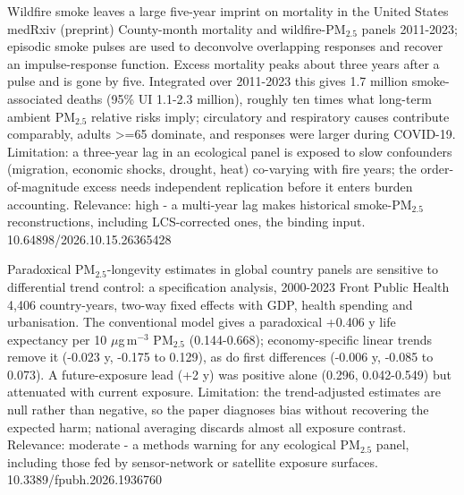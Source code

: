 \documentclass[10pt]{article}
\begin{document}
{Wildfire smoke leaves a large five-year imprint on mortality in the United States}
{medRxiv (preprint)}
{County-month mortality and wildfire-PM$_{2.5}$ panels 2011-2023; episodic smoke pulses are used to deconvolve overlapping responses and recover an impulse-response function. Excess mortality peaks about three years after a pulse and is gone by five. Integrated over 2011-2023 this gives 1.7 million smoke-associated deaths (95\% UI 1.1-2.3 million), roughly ten times what long-term ambient PM$_{2.5}$ relative risks imply; circulatory and respiratory causes contribute comparably, adults >=65 dominate, and responses were larger during COVID-19. Limitation: a three-year lag in an ecological panel is exposed to slow confounders (migration, economic shocks, drought, heat) co-varying with fire years; the order-of-magnitude excess needs independent replication before it enters burden accounting. Relevance: high - a multi-year lag makes historical smoke-PM$_{2.5}$ reconstructions, including LCS-corrected ones, the binding input.}
{10.64898/2026.10.15.26365428}

{Paradoxical PM$_{2.5}$-longevity estimates in global country panels are sensitive to differential trend control: a specification analysis, 2000-2023}
{Front Public Health}
{4,406 country-years, two-way fixed effects with GDP, health spending and urbanisation. The conventional model gives a paradoxical +0.406 y life expectancy per 10 $\mu$g\,m$^{-3}$ PM$_{2.5}$ (0.144-0.668); economy-specific linear trends remove it (-0.023 y, -0.175 to 0.129), as do first differences (-0.006 y, -0.085 to 0.073). A future-exposure lead (+2 y) was positive alone (0.296, 0.042-0.549) but attenuated with current exposure. Limitation: the trend-adjusted estimates are null rather than negative, so the paper diagnoses bias without recovering the expected harm; national averaging discards almost all exposure contrast. Relevance: moderate - a methods warning for any ecological PM$_{2.5}$ panel, including those fed by sensor-network or satellite exposure surfaces.}
{10.3389/fpubh.2026.1936760}

\par{}\baselineskip{}\baselineskip
{}
\end{document}
